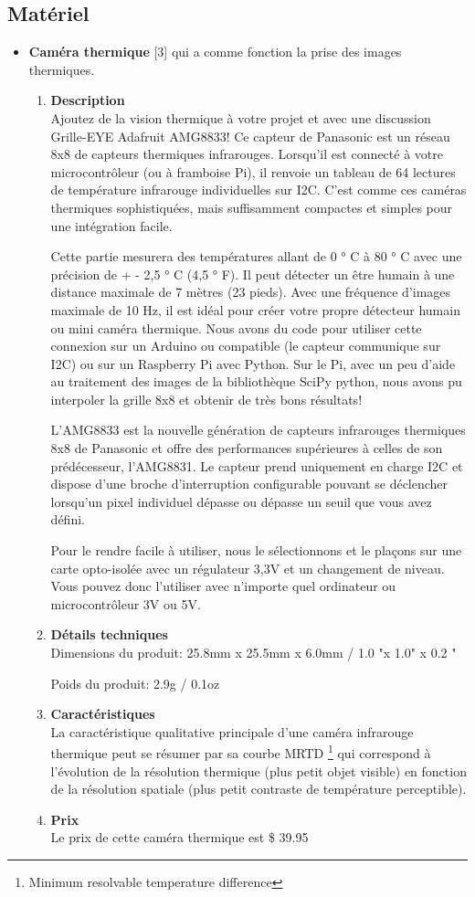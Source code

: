 \documentclass[12pt]{article}
\begin{document}
\subsection{Matériel}
\begin{itemize}
	\item \textbf{Caméra thermique} [3] qui a comme fonction la prise des images thermiques.
	\begin{enumerate}
	\item \textbf{Description}\\
Ajoutez de la vision thermique à votre projet et avec une discussion Grille-EYE Adafruit AMG8833! Ce capteur de Panasonic est un réseau 8x8 de capteurs thermiques infrarouges. Lorsqu'il est connecté à votre microcontrôleur (ou à framboise Pi), il renvoie un tableau de 64 lectures de température infrarouge individuelles sur I2C. C'est comme ces caméras thermiques sophistiquées, mais suffisamment compactes et simples pour une intégration facile.

Cette partie mesurera des températures allant de 0 ° C à 80 ° C avec une précision de + - 2,5 ° C (4,5 ° F). Il peut détecter un être humain à une distance maximale de 7 mètres (23 pieds). Avec une fréquence d'images maximale de 10 Hz, il est idéal pour créer votre propre détecteur humain ou mini caméra thermique. Nous avons du code pour utiliser cette connexion sur un Arduino ou compatible (le capteur communique sur I2C) ou sur un Raspberry Pi avec Python. Sur le Pi, avec un peu d'aide au traitement des images de la bibliothèque SciPy python, nous avons pu interpoler la grille 8x8 et obtenir de très bons résultats!

L'AMG8833 est la nouvelle génération de capteurs infrarouges thermiques 8x8 de Panasonic et offre des performances supérieures à celles de son prédécesseur, l'AMG8831. Le capteur prend uniquement en charge I2C et dispose d'une broche d'interruption configurable pouvant se déclencher lorsqu'un pixel individuel dépasse ou dépasse un seuil que vous avez défini.

Pour le rendre facile à utiliser, nous le sélectionnons et le plaçons sur une carte opto-isolée avec un régulateur 3,3V et un changement de niveau. Vous pouvez donc l’utiliser avec n’importe quel ordinateur ou microcontrôleur 3V ou 5V.
	\item \textbf{Détails techniques}\\
	Dimensions du produit: 25.8mm x 25.5mm x 6.0mm / 1.0 "x 1.0" x 0.2 "
	
	Poids du produit: 2.9g / 0.1oz
	\item \textbf{Caractéristiques}\\
	La caractéristique qualitative principale d’une caméra infrarouge thermique peut se résumer par sa courbe MRTD \footnote{Minimum resolvable temperature difference} qui correspond à l’évolution de la résolution thermique (plus petit objet visible) en fonction de la résolution spatiale (plus petit contraste de température perceptible).
	\item \textbf{Prix}\\
	Le prix de cette caméra thermique est  \$ 39.95  
	\newpage
\end{enumerate}	 


\end{itemize}
\end{document}
